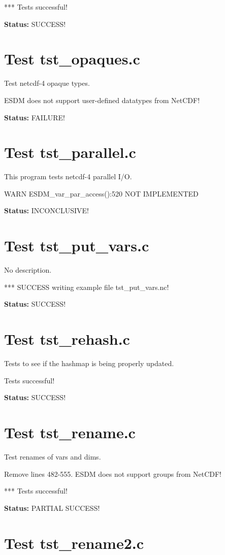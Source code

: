 *** Tests successful!

{\bf \large Status: } SUCCESS!

\section{Test tst\_opaques.c}

Test netcdf-4 opaque types.

ESDM does not support user-defined datatypes from NetCDF!

{\bf \large Status: } FAILURE!

\section{Test tst\_parallel.c}

This program tests netcdf-4 parallel I/O.

WARN ESDM\_var\_par\_access():520 NOT IMPLEMENTED

{\bf \large Status: } INCONCLUSIVE!

\section{Test tst\_put\_vars.c}

No description.

*** SUCCESS writing example file tst\_put\_vars.nc!

{\bf \large Status: } SUCCESS!

\section{Test tst\_rehash.c}

Tests to see if the hashmap is being properly updated.

Tests successful!

{\bf \large Status: } SUCCESS!

\section{Test tst\_rename.c}

Test renames of vars and dims.

Remove lines 482-555. ESDM does not support groups from NetCDF!

*** Tests successful!

{\bf \large Status: } PARTIAL SUCCESS!

\section{Test tst\_rename2.c}

